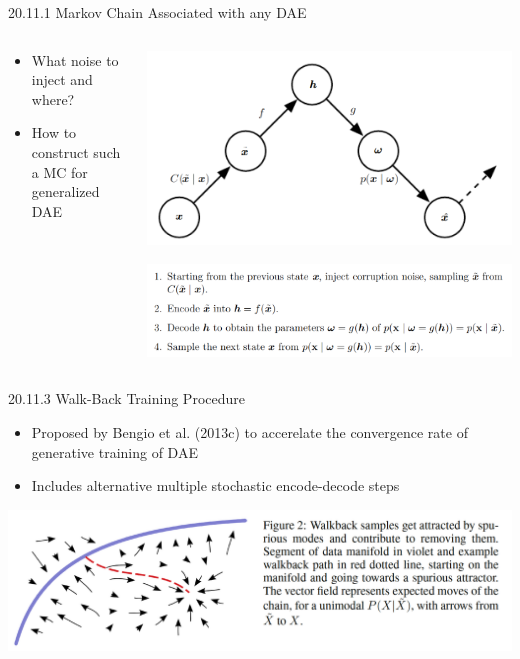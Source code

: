 \documentclass[dvipdfmx,presentation]{beamer}
\begin{document}
\begin{frame}[label={sec:orgheadline45}]{20.11.1 Markov Chain Associated with any DAE}
\begin{columns}
\begin{column}{0.50\columnwidth}
\begin{itemize}
\item What noise to inject and where?
\item How to construct such a MC for generalized DAE
\end{itemize}
\end{column}

\begin{column}{0.50\columnwidth}
\centering
\includegraphics[width=1.1\textwidth]{./figure/dlbook_fig20_11.png}

\includegraphics[width=1.1\textwidth]{./figure/dlbook_fig20_11b.png}
\end{column}
\end{columns}
\end{frame}

\begin{frame}[label={sec:orgheadline46}]{20.11.3 Walk-Back Training Procedure}
\begin{itemize}
\item Proposed by Bengio et al. (2013c) to accerelate the convergence rate of generative training of DAE
\item Includes alternative multiple stochastic encode-decode steps
\end{itemize}
\centering
\includegraphics[width=\textwidth]{./figure/bengio2013cfig2.png}
\end{frame}
\end{document}
